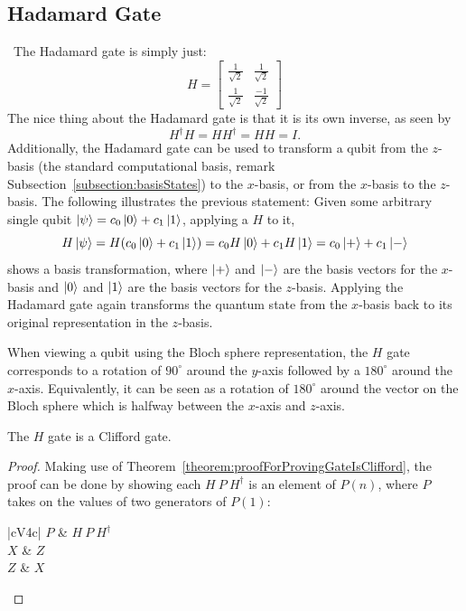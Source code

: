 \subsection{Hadamard Gate}\
The Hadamard gate is simply just:
$$H = \begin{bmatrix} \frac{1}{\sqrt{2}} & \frac{1}{\sqrt{2}} \\ \frac{1}{\sqrt{2}} & \frac{-1}{\sqrt{2}}\end{bmatrix}$$
The nice thing about the Hadamard gate is that it is its own inverse, as seen by $$H^{\dagger}H = HH^{\dagger} = HH = I.$$ Additionally, the Hadamard gate can be used to transform a qubit from the $z$-basis (the standard computational basis, remark Subsection~\ref{subsection:basisStates}) to the $x$-basis, or from the $x$-basis to the $z$-basis. The following illustrates the previous statement: Given some arbitrary single qubit $\ket{\psi} = c_0\ket{0} + c_1\ket{1}$, applying a $H$ to it,
$$H\ket{\psi} = H(c_0\ket{0} + c_1\ket{1}) = c_0H\ket{0} + c_1H\ket{1} = c_0\ket{+} + c_1\ket{-}$$
shows a basis transformation, where $\ket{+}$ and $\ket{-}$ are the basis vectors for the $x$-basis and $\ket{0}$ and $\ket{1}$ are the basis vectors for the $z$-basis. Applying the Hadamard gate again transforms the quantum state from the $x$-basis back to its original representation in the $z$-basis.

When viewing a qubit using the Bloch sphere representation, the $H$ gate corresponds to a rotation of $90^{\circ}$ around the $y$-axis followed by a $180^{\circ}$ around the $x$-axis. Equivalently, it can be seen as a rotation of $180^{\circ}$ around the vector on the Bloch sphere which is halfway between the $x$-axis and $z$-axis.
\begin{theorem}
The $H$ gate is a Clifford gate.
\end{theorem}
\begin{proof}
Making use of Theorem~\ref{theorem:proofForProvingGateIsClifford}, the proof can be done by showing each $H \ P \ H^{\dagger}$ is an element of $P(n)$, where $P$ takes on the values of two generators of $P(1)$:
\begin{table}[H]
\caption{A table showing $H$ is a Clifford gate. \label{table:HisAcliffordGate}}
\begin{center}
\begin{tabular}{ |cV{4}c| }
\hline
$P$ & $H \ P \ H^{\dagger}$ \\
 $X$ & $Z$ \\
\hline $Z$ & $X$ \\
\hline
\end{tabular}
\end{center}
\end{table}
\end{proof}

